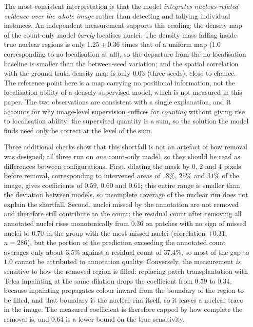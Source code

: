 \documentclass[preprint,12pt]{elsarticle}
\begin{document}
The most consistent interpretation is that the model \emph{integrates nucleus-related evidence over the whole
image} rather than detecting and tallying individual instances. An independent measurement supports this
reading: the density map of the count-only model \emph{barely} localises nuclei. The density mass falling
inside true nuclear regions is only $1.25\pm0.36$ times that of a uniform map ($1.0$ corresponding to no
localisation at all), so the departure from the no-localisation baseline is smaller than the between-seed
variation; and the spatial correlation with the ground-truth density map is only $0.03$ (three seeds), close to
chance. The reference point here is a map carrying no positional information, not the localisation ability of a
densely supervised model, which is not measured in this paper. The two observations are consistent with a
single explanation, and it accounts for why image-level supervision suffices for \emph{counting} without giving
rise to localisation ability: the supervised quantity is a sum, so the solution the model finds need only be
correct at the level of the sum.

Three additional checks show that this shortfall is not an artefact of how removal was designed; all three run
on \emph{one} count-only model, so they should be read as differences between configurations. First, dilating
the mask by $0$, $2$ and $4$ pixels before removal, corresponding to intervened areas of $18\%$, $25\%$ and
$31\%$ of the image, gives coefficients of $0.59$, $0.60$ and $0.61$; this entire range is smaller than the
deviation between models, so incomplete coverage of the nuclear rim does not explain the shortfall. Second,
nuclei missed by the annotation are not removed and therefore still contribute to the count: the residual count
after removing all annotated nuclei rises monotonically from $0.36$ on patches with no sign of missed nuclei to
$0.70$ in the group with the most missed nuclei (correlation $+0.31$, $n = 286$), but the portion of the
prediction exceeding the annotated count averages only about $3.5\%$ against a residual count of $37.4\%$, so
most of the gap to $1.0$ cannot be attributed to annotation quality. Conversely, the measurement \emph{is}
sensitive to how the removed region is filled: replacing patch transplantation with Telea inpainting at the
same dilation drops the coefficient from $0.59$ to $0.34$, because inpainting propagates colour inward from the
boundary of the region to be filled, and that boundary is the nuclear rim itself, so it leaves a nuclear trace
in the image. The measured coefficient is therefore capped by how complete the removal is, and $0.64$ is a
lower bound on the true sensitivity.
\end{document}
